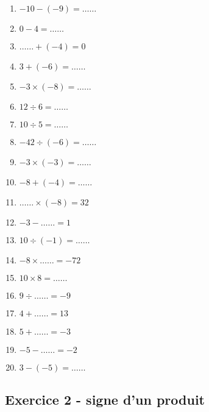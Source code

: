 \documentclass[11pt]{article}
\begin{document}
\begin{multicols}{3}\noindent
    \begin{enumerate}
        \item $-10 - \left( -9\right) = \ldots\ldots$
        \item $0 - 4 = \ldots\ldots$
        \item $\ldots\ldots + \left( -4\right) = 0$
        \item $3 + \left( -6\right) = \ldots\ldots$
        \item $-3 \times \left( -8\right) = \ldots\ldots$
        \item $12 \div 6 = \ldots\ldots$
        \item $10 \div 5 = \ldots\ldots$
        \item $-42 \div \left( -6\right) = \ldots\ldots$
        \item $-3 \times \left( -3\right) = \ldots\ldots$
        \item $-8 + \left( -4\right) = \ldots\ldots$
        \item $\ldots\ldots \times \left( -8\right) = 32$
        \item $-3 - \ldots\ldots = 1$
        \item $10 \div \left( -1\right) = \ldots\ldots$
        \item $-8 \times \ldots\ldots = -72$
        \item $10 \times 8 = \ldots\ldots$
        \item $9 \div \ldots\ldots = -9$
        \item $4 + \ldots\ldots = 13$
        \item $5 + \ldots\ldots = -3$
        \item $-5 - \ldots\ldots = -2$
        \item $3 - \left( -5\right) = \ldots\ldots$
    \end{enumerate}
  \end{multicols}

\subsection*{Exercice 2 - signe d'un produit}
\end{document}
